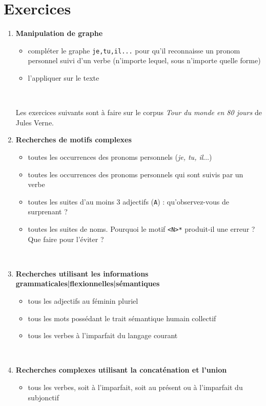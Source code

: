 \documentclass[xcolor={table,usenames,dvipsnames}]{article}
\begin{document}
\section{Exercices}
\begin{enumerate}
	\item \textbf{Manipulation de graphe}
	\begin{itemize}
		\item compléter le graphe \texttt{je,tu,il...} pour qu'il reconnaisse un pronom personnel suivi d'un verbe (n'importe lequel, sous n'importe quelle forme)
		\item l'appliquer sur le texte
	\end{itemize}
	\\
	\bigskip
	
	Les exercices suivants sont à faire sur le corpus \textit{Tour du monde en 80 jours} de Jules Verne.
		\\
	\medskip
	
\item \textbf{Recherches de motifs complexes}
	\begin{itemize}
		\item toutes les occurrences des pronoms personnels (\textit{je, tu, il$\dots$})
		\item toutes les occurrences des pronoms personnels qui sont suivis par un verbe
		\item toutes les suites d'au moins 3 adjectifs (\texttt{A}) : qu'observez-vous de surprenant ?
		\item toutes les suites de noms. Pourquoi le motif \texttt{<N>*} produit-il une erreur ? Que faire pour l'éviter ?
	\end{itemize}
	\\
	\bigskip
	
	\item \textbf{Recherches utilisant les informations grammaticales|flexionnelles|sémantiques}
	\begin{itemize}
		\item tous les adjectifs au féminin pluriel
		\item tous les mots possédant le trait sémantique \og{}humain collectif\fg{}
		\item tous les verbes à l'imparfait du langage courant
	\end{itemize}
	
		\\
	\bigskip
	
	\item \textbf{Recherches complexes utilisant la concaténation et l'union}
	\begin{itemize}
		\item tous les verbes, soit à l'imparfait, soit au présent ou à l'imparfait du subjonctif
	\end{itemize}
	\\
	\bigskip


\end{enumerate}
\end{document}
